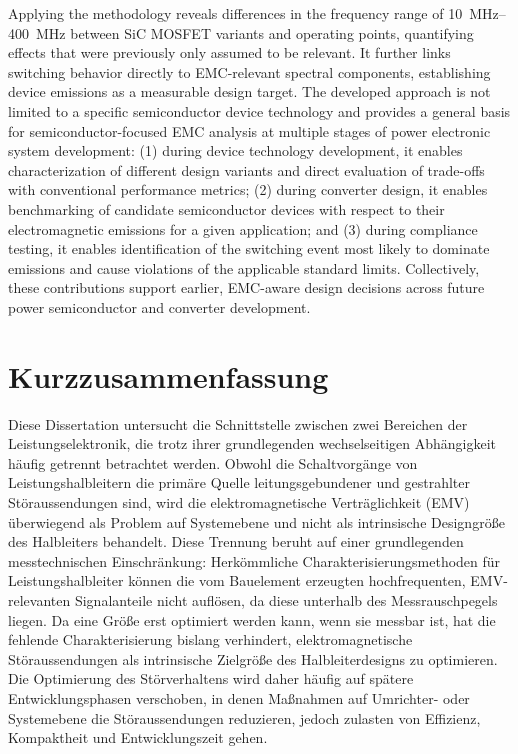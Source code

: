 Applying the methodology reveals differences in the frequency range of \SIrange{10}{400}{MHz} between SiC MOSFET variants and operating points, quantifying effects that were previously only assumed to be relevant.
It further links switching behavior directly to EMC-relevant spectral components, establishing device emissions as a measurable design target.
The developed approach is not limited to a specific semiconductor device technology and provides a general basis for semiconductor-focused EMC analysis at multiple stages of power electronic system development:
(1) during device technology development, it enables characterization of different design variants and direct evaluation of trade-offs with conventional performance metrics;
(2) during converter design, it enables benchmarking of candidate semiconductor devices with respect to their electromagnetic emissions for a given application; and
(3) during compliance testing, it enables identification of the switching event most likely to dominate emissions and cause violations of the applicable standard limits.
Collectively, these contributions support earlier, EMC-aware design decisions across future power semiconductor and converter development.




\chapter{Kurzzusammenfassung}

Diese Dissertation untersucht die Schnittstelle zwischen zwei Bereichen der Leistungselektronik, die trotz ihrer grundlegenden wechselseitigen Abhängigkeit häufig getrennt betrachtet werden.
Obwohl die Schaltvorgänge von Leistungshalbleitern die primäre Quelle leitungsgebundener und gestrahlter Störaussendungen sind, wird die elektromagnetische Verträglichkeit (EMV) überwiegend als Problem auf Systemebene und nicht als intrinsische Designgröße des Halbleiters behandelt.
Diese Trennung beruht auf einer grundlegenden messtechnischen Einschränkung: Herkömmliche Charakterisierungsmethoden für Leistungshalbleiter können die vom Bauelement erzeugten hochfrequenten, EMV-relevanten Signalanteile nicht auflösen, da diese unterhalb des Messrauschpegels liegen.
Da eine Größe erst optimiert werden kann, wenn sie messbar ist, hat die fehlende Charakterisierung bislang verhindert, elektromagnetische Störaussendungen als intrinsische Zielgröße des Halbleiterdesigns zu optimieren.
Die Optimierung des Störverhaltens wird daher häufig auf spätere Entwicklungsphasen verschoben, in denen Maßnahmen auf Umrichter- oder Systemebene die Störaussendungen reduzieren, jedoch zulasten von Effizienz, Kompaktheit und Entwicklungszeit gehen.

